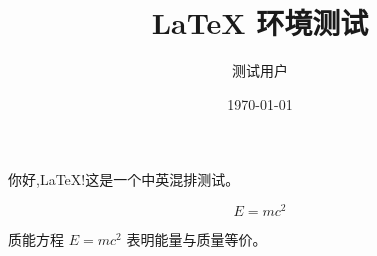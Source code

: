\documentclass[UTF8,zihao=-4]{ctexart}
\title{LaTeX 环境测试}
\author{测试用户}
\date{\today}
\begin{document}
\maketitle

你好,LaTeX!这是一个中英混排测试。

\begin{equation}
    E = mc^2
\end{equation}

质能方程 $E = mc^2$ 表明能量与质量等价。
\end{document}
